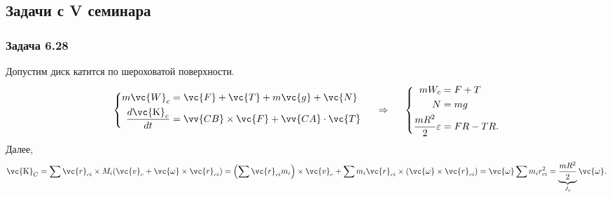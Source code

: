 \subsection{Задачи с V семинара}
\subsubsection*{Задача 6.28}

Допустим диск катится по шероховатой поверхности.
$$
\left\{\begin{aligned}
    m \vc{W}_c &= \vc{F} + \vc{T} + m \vc{g} + \vc{N} \\
    \frac{d \vc{\mathrm{K}}_c}{dt}  &= \vv{CB} \times \vc{F} + \vv{CA} \cdot \vc{T}
\end{aligned}\right. 
\hspace{0.5cm} \Rightarrow \hspace{0.5cm} 
\left\{\begin{aligned}
    m W_c &= F + T \\
    N &= mg \\
    \frac{m R^2}{2} \varepsilon &= FR - TR.
\end{aligned}\right.
$$
Далее,
$$
    \vc{\mathrm{K}}_C = \sum \vc{r}_{ci} \times M_i (\vc{v}_c + \vc{\omega} \times \vc{r}_{ci}) = \left(\sum \vc{r}_{ci} m_i\right) \times \vc{v}_c + \sum m_i \vc{r}_{ci} \times (\vc{\omega}\times \vc{r}_{ci}) = \vc{\omega} \sum m_i r^2_{ci} = \underbrace{\frac{mR^2}{2}}_{J_c} \vc{\omega}.
$$

